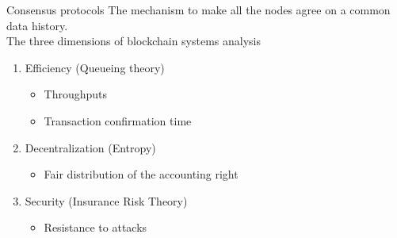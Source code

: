 \documentclass{beamer}
\begin{document}

\begin{frame}{Consensus protocols}
The mechanism to make all the nodes agree on a common data history.\\
\vspace{0.3cm}
The three dimensions of blockchain systems analysis
\begin{enumerate}
  \item Efficiency (Queueing theory)
  \begin{itemize}
    \item Throughputs
    \item Transaction confirmation time
  \end{itemize}
  \item Decentralization (Entropy)
  \begin{itemize}
    \item Fair distribution of the accounting right
  \end{itemize}
  \item Security (Insurance Risk Theory)
  \begin{itemize}
    \item Resistance to attacks
  \end{itemize}
\end{enumerate}
\end{frame}
\end{document}
